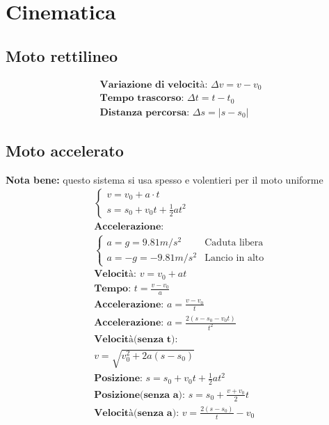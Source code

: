 \section{Cinematica}
\subsection{Moto rettilineo}
\begin{gather*}
\textbf{Variazione di velocità: } \Delta v = v - v_0 \\
\textbf{Tempo trascorso: } \Delta t = t - t_0 \\
\textbf{Distanza percorsa: } \Delta s = \left| s - s_0 \right|
\end{gather*}
\subsection{Moto accelerato}
\textbf{Nota bene: } questo sistema si usa spesso e volentieri per il moto uniforme
\begin{gather*}
\begin{cases}
    v = v_0 + a \cdot t \\
    s = s_0 + v_0 t + \frac{1}{2} a t^2
\end{cases}
\\
\textbf{Accelerazione:} \\
\begin{cases}
 a = g = 9.81 m/s^2 & \text{Caduta libera} \\
 a = -g = - 9.81m/s^2 & \text{Lancio in alto}
\end{cases}
\\
\textbf{Velocità: } v = v_0 + a t \\
\textbf{Tempo: } t = \frac{v - v_0}{a} \\
\textbf{Accelerazione: } a = \frac{v - v_0}{t} \\
\textbf{Accelerazione: } a = \frac{2 (s - s_0 - v_0 t)}{t^2} \\
\textbf{Velocità(senza t): } \\ v = \sqrt{v_0^2 + 2 a (s - s_0)} \\
\textbf{Posizione: } s = s_0 + v_0 t + \frac{1}{2} a t^2 \\
\textbf{Posizione(senza a): } s = s_0 + \frac{v + v_0}{2} t \\
\textbf{Velocità(senza a): } v = \frac{2 (s - s_0)}{t} - v_0
\end{gather*}
